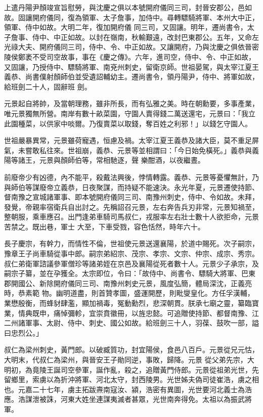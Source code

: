 \begin{pinyinscope}
 上遣丹陽尹顏竣宣旨慰勞，與沈慶之俱以本號開府儀同三司，封晉安郡公，邑如故。固讓開府儀同，復為領軍、太子詹事，加侍中。尋轉驃騎將軍、本州大中正，領軍、侍中如故。大明二年，復加開府儀
 同三司，又固讓。明年，遷尚書令，太子詹事、侍中、中正如故。以封在嶺南，秋輸艱遠，改封巴東郡公。五年，又命左光祿大夫、開府儀同三司，侍中、令、中正如故。又讓開府，乃與沈慶之俱依晉密陵侯鄭袤不受司空故事，事在《慶之傳》。六年，進司空，侍中、令、中正如故，又固讓，乃授侍中、驃騎將軍、南兗州刺史，留衛京師。世祖晏駕，與太宰江夏王義恭、尚書僕射顏師伯並受遺詔輔幼主。遷尚書令，領丹陽尹，侍中、將軍如故，給班劍二十人，固辭班
 劍。



 元景起自將帥，及當朝理務，雖非所長，而有弘雅之美。時在朝勳要，多事產業，唯元景獨無所營。南岸有數十畝菜園，守園人賣得錢二萬送還宅，元景曰：「我立此園種菜，以供家中啖爾。乃復賣菜以取錢，奪百姓之利邪！」以錢乞守園人。



 世祖嚴暴異常，元景雖荷寵遇，恒慮及禍。太宰江夏王義恭及諸大臣，莫不重足屏氣，未嘗敢私往來。世祖崩，義恭、元景等並相謂曰：「今日始免橫死。」義恭與義陽等諸王，元景與顏師伯等，常相馳逐，聲
 樂酣酒，以夜繼晝。



 前廢帝少有凶德，內不能平，殺戴法興後，悖情轉露。義恭、元景等憂懼無計，乃與師伯等謀廢帝立義恭，日夜聚謀，而持疑不能速決。永光年夏，元景遷使持節、督南豫之宣城諸軍事、即本號開府儀同三司、南豫州刺史，侍中、令如故。未拜，發覺，帝親率宿衛兵自出討之。先稱詔召元景，左右奔告兵刃非常，元景知禍至，整朝服，乘車應召。出門逢弟車騎司馬叔仁，戎服率左右壯士數十人欲拒命，元景苦禁之。既出巷，軍士
 大至，下車受戮，容色恬然，時年六十。



 長子慶宗，有幹力，而情性不倫，世祖使元景送還襄陽，於道中賜死。次子嗣宗，豫章王子尚車騎從事中郎。嗣宗弟紹宗、茂宗、孝宗、文宗、仲宗、成宗、秀宗。叔仁弟衛軍諮議參軍僧珍等諸弟姪在京邑及襄陽從死者數十人。元景少子承宗，及嗣宗子纂，並在孕獲全。太宗即位，令曰：「故侍中、尚書令、驃騎大將軍、巴東郡開國公、新除開府儀同三司、南豫州刺史元景，風度弘簡，體局深沈，正義亮時，恭素範
 物。幽明道盡，則首贊孝圖，盛運開歷，則毗燮皇化。方任孚漢輔，業懋殷衡，而蜂豺肆濫，顯加禍毒，冤動勳烈，悲深朝貫。朕承七廟之靈，纂臨寶業，情典既申，痛悼彌軫，宜崇賁徽冊，以旌忠懿。可追贈使持節、都督南豫、江二州諸軍事、太尉、侍中、刺史、國公如故。給班劍三十人，羽葆、鼓吹一部，謚曰忠烈公。」



 叔仁為梁州刺史，黃門郎。以破臧質功，封宜陽侯，食邑八百戶。元景從兄元怙，大明末，代叔仁為梁州，與晉安王子勛同逆，事敗，歸降。元景
 從父弟先宗，大明初，為竟陵王誕司空參軍，誕作亂，殺之，追贈黃門侍郎。元景從祖弟光世，先留鄉里，索虜以為折沖將軍、河北太守，封西陵男。光世姊夫偽司徒崔浩，虜之相也。元嘉二十七年，虜主拓跋燾南寇汝、潁，浩密有異圖，光世要河北義士為浩應。浩謀泄被誅，河東大姓坐連謀夷滅者甚眾，光世南奔得免。太祖以為振武將軍。




\end{pinyinscope}
